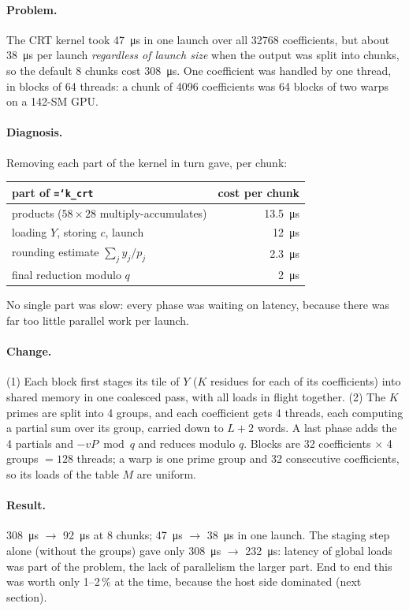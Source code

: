 \documentclass[11pt,a4paper]{article}
\newcommand{\code}[1]{\texttt{\hyphenchar\font=`\-\relax #1}}
\newcommand{\us}[1]{\SI{#1}{\micro\second}}
\begin{document}
\paragraph{Problem.} The CRT kernel took \us{47} in one launch over all 32768
coefficients, but about \us{38} per launch \emph{regardless of launch size} when
the output was split into chunks, so the default 8 chunks cost \us{308}. One
coefficient was handled by one thread, in blocks of 64 threads: a chunk of 4096
coefficients was 64 blocks of two warps on a 142-SM GPU.

\paragraph{Diagnosis.} Removing each part of the kernel in turn gave, per chunk:
\begin{center}
\begin{tabular}{lr}
\toprule
part of \code{k\_crt} & cost per chunk \\
\midrule
products ($58 \times 28$ multiply-accumulates) & \us{13.5} \\
loading $Y$, storing $c$, launch & \us{12} \\
rounding estimate $\sum_j y_j/p_j$ & \us{2.3} \\
final reduction modulo $q$ & \us{2} \\
\bottomrule
\end{tabular}
\end{center}
No single part was slow: every phase was waiting on latency, because there was far
too little parallel work per launch.

\paragraph{Change.} (1) Each block first stages its tile of $Y$ ($K$ residues for
each of its coefficients) into shared memory in one coalesced pass, with all loads
in flight together. (2) The $K$ primes are split into 4 groups, and each coefficient
gets 4 threads, each computing a partial sum over its group, carried down to $L+2$
words. A last phase adds the 4 partials and $-vP \bmod q$ and reduces modulo $q$.
Blocks are 32 coefficients $\times$ 4 groups $= 128$ threads; a warp is one prime group
and 32 consecutive coefficients, so its loads of the table $M$ are uniform.

\paragraph{Result.} \us{308} $\to$ \us{92} at 8 chunks; \us{47} $\to$ \us{38} in one
launch. The staging step alone (without the groups) gave only
\us{308} $\to$ \us{232}: latency of global loads was part of the problem, the lack of
parallelism the larger part. End to end this was worth only 1--2\,\% at the time,
because the host side dominated (next section).
\end{document}

